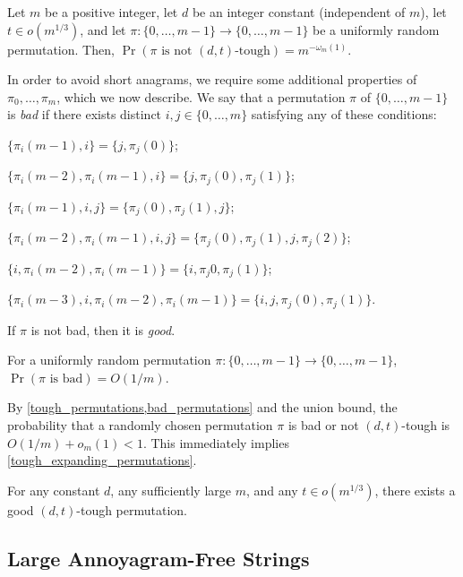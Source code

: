 \documentclass[kpfonts]{patmorin}
\begin{document}
\begin{lem}\label{tough_permutations}
    Let $m$ be a positive integer, let $d$ be an integer constant (independent of $m$), let $t\in o(m^{1/3})$,  and let $\pi:\{0,\ldots,m-1\}\to\{0,\ldots,m-1\}$ be a uniformly random permutation.  Then, $\Pr\left(\mbox{$\pi$ is not $(d,t)$-tough}\right)=m^{-\omega_m(1)}$.
\end{lem}

In order to avoid short anagrams, we require some additional properties of $\pi_0,\ldots,\pi_m$, which we now describe.  We say that a permutation $\pi$ of $\{0,\ldots,m-1\}$ is \emph{bad} if there exists distinct $i,j\in\{0,\ldots,m\}$ satisfying any of these conditions:
\begin{compactenum}[(C1)]
    \item $\{\pi_i(m-1),i\}=\{j,\pi_j(0)\}$;\label{two_two}\label{first}
    \item $\{\pi_i(m-2),\pi_i(m-1),i\} = \{j,\pi_j(0),\pi_j(1)\}$;\label{three_three}

    \item $\{\pi_i(m-1),i,j\}=\{\pi_j(0),\pi_j(1),j\}$;\label{two_three}
    \item $\{\pi_i(m-2),\pi_i(m-1),i,j\}=\{\pi_j(0),\pi_j(1),j,\pi_j(2)\}$;\label{three_four}

    \item $\{i,\pi_i(m-2),\pi_i(m-1)\}=\{i,\pi_j{0},\pi_j(1)\}$;
    \item $\{\pi_i(m-3),i,\pi_i(m-2),\pi_i(m-1)\}=\{i,j,\pi_j(0),\pi_j(1)\}$.\label{last}
\end{compactenum}
If $\pi$ is not bad, then it is \emph{good}.

\begin{lem}\label{bad_permutations}
    For a uniformly random permutation $\pi:\{0,\ldots,m-1\}\to\{0,\ldots,m-1\}$, $\Pr(\mbox{$\pi$ is bad}) = O(1/m)$.
\end{lem}

By \cref{tough_permutations,bad_permutations} and the union bound, the probability that a randomly chosen permutation $\pi$ is bad or not $(d,t)$-tough is $O(1/m)+o_m(1) < 1$.  This immediately implies \cref{tough_expanding_permutations}.
\begin{cor}\label{good_tough_permutations}
    For any constant $d$, any sufficiently large $m$, and any $t\in o(m^{1/3})$, there exists a good $(d,t)$-tough permutation.
\end{cor}

\subsection{Large Annoyagram-Free Strings}
\end{document}
